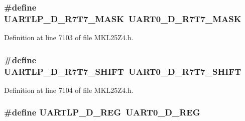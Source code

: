 \subsubsection[{\texorpdfstring{U\+A\+R\+T\+L\+P\+\_\+\+D\+\_\+\+R7\+T7\+\_\+\+M\+A\+SK}{UARTLP_D_R7T7_MASK}}]{\setlength{\rightskip}{0pt plus 5cm}\#define U\+A\+R\+T\+L\+P\+\_\+\+D\+\_\+\+R7\+T7\+\_\+\+M\+A\+SK~{\bf U\+A\+R\+T0\+\_\+\+D\+\_\+\+R7\+T7\+\_\+\+M\+A\+SK}}\hypertarget{group___backward___compatibility___symbols_gac4d9354f0bdb6c5e9eac60835c37bb0a}{}\label{group___backward___compatibility___symbols_gac4d9354f0bdb6c5e9eac60835c37bb0a}


Definition at line 7103 of file M\+K\+L25\+Z4.\+h.

\subsubsection[{\texorpdfstring{U\+A\+R\+T\+L\+P\+\_\+\+D\+\_\+\+R7\+T7\+\_\+\+S\+H\+I\+FT}{UARTLP_D_R7T7_SHIFT}}]{\setlength{\rightskip}{0pt plus 5cm}\#define U\+A\+R\+T\+L\+P\+\_\+\+D\+\_\+\+R7\+T7\+\_\+\+S\+H\+I\+FT~{\bf U\+A\+R\+T0\+\_\+\+D\+\_\+\+R7\+T7\+\_\+\+S\+H\+I\+FT}}\hypertarget{group___backward___compatibility___symbols_gab2a3957242355f16f9523cdba45c32b6}{}\label{group___backward___compatibility___symbols_gab2a3957242355f16f9523cdba45c32b6}


Definition at line 7104 of file M\+K\+L25\+Z4.\+h.

\subsubsection[{\texorpdfstring{U\+A\+R\+T\+L\+P\+\_\+\+D\+\_\+\+R\+EG}{UARTLP_D_REG}}]{\setlength{\rightskip}{0pt plus 5cm}\#define U\+A\+R\+T\+L\+P\+\_\+\+D\+\_\+\+R\+EG~{\bf U\+A\+R\+T0\+\_\+\+D\+\_\+\+R\+EG}}\hypertarget{group___backward___compatibility___symbols_ga9c70e0809fd9ecca67c7cb8385a81a2c}{}\label{group___backward___compatibility___symbols_ga9c70e0809fd9ecca67c7cb8385a81a2c}


